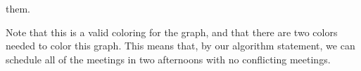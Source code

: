 them.
\\
\begin{center}
\end{center}
%
Note that this is a valid coloring for the graph, and that there are two colors
needed to color this graph. This means that, by our algorithm statement, we 
can schedule all of the meetings in two afternoons with no conflicting meetings.
